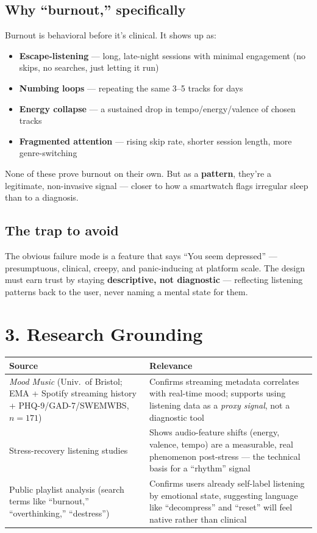 \documentclass[11pt,a4paper]{article}
\begin{document}
\subsection*{Why ``burnout,'' specifically}
Burnout is behavioral before it's clinical. It shows up as:

\begin{itemize}[leftmargin=1.4em]
  \item \textbf{Escape-listening} --- long, late-night sessions with minimal engagement (no skips, no searches, just letting it run)
  \item \textbf{Numbing loops} --- repeating the same 3--5 tracks for days
  \item \textbf{Energy collapse} --- a sustained drop in tempo/energy/valence of chosen tracks
  \item \textbf{Fragmented attention} --- rising skip rate, shorter session length, more genre-switching
\end{itemize}

None of these prove burnout on their own. But as a \textbf{pattern}, they're a legitimate, non-invasive signal --- closer to how a smartwatch flags irregular sleep than to a diagnosis.

\subsection*{The trap to avoid}
The obvious failure mode is a feature that says ``You seem depressed'' --- presumptuous, clinical, creepy, and panic-inducing at platform scale. The design must earn trust by staying \textbf{descriptive, not diagnostic} --- reflecting listening patterns back to the user, never naming a mental state for them.

\section*{3. Research Grounding}

\begin{table}[h!]
\renewcommand{\arraystretch}{1.4}
\begin{tabularx}{\textwidth}{@{}p{4.2cm}X@{}}
\toprule
\textbf{Source} & \textbf{Relevance} \\
\midrule
\emph{Mood Music} (Univ.\ of Bristol; EMA + Spotify streaming history + PHQ-9/GAD-7/SWEMWBS, $n=171$) &
Confirms streaming metadata correlates with real-time mood; supports using listening data as a \emph{proxy signal}, not a diagnostic tool \\
Stress-recovery listening studies &
Shows audio-feature shifts (energy, valence, tempo) are a measurable, real phenomenon post-stress --- the technical basis for a ``rhythm'' signal \\
Public playlist analysis (search terms like ``burnout,'' ``overthinking,'' ``destress'') &
Confirms users already self-label listening by emotional state, suggesting language like ``decompress'' and ``reset'' will feel native rather than clinical \\
\bottomrule
\end{tabularx}
\end{table}
\end{document}
